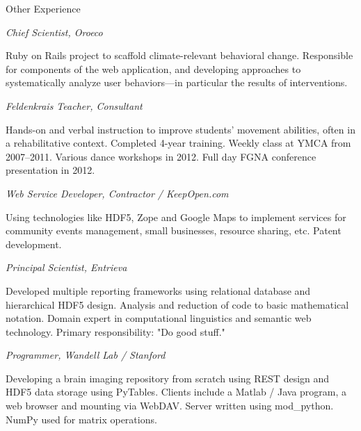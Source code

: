 \begin{rubric}{Other Experience}


\entry*[2012--present] \emph{Chief Scientist, Oroeco}
    \par Ruby on Rails project to scaffold climate-relevant behavioral change.
    Responsible for components of the web application, and developing approaches
    to systematically analyze user behaviors---in particular the results of
    interventions.

\entry*[2007--present] \emph{Feldenkrais Teacher, Consultant}
    \par  Hands-on and verbal instruction to improve students' movement
    abilities, often in a rehabilitative context.
    Completed 4-year training. Weekly class at YMCA from 2007--2011. Various
    dance workshops in 2012. Full day FGNA conference presentation in 2012.


\entry*[2004--2013] \emph{Web Service Developer, Contractor / KeepOpen.com}
    \par Using technologies like HDF5, Zope and Google Maps to implement services
    for community events management, small businesses, resource sharing, etc.
    Patent development.

\entry*[2006--2007] \emph{Principal Scientist, Entrieva}
    \par Developed multiple reporting frameworks using relational database and
    hierarchical HDF5 design.  Analysis and reduction of code to basic
    mathematical notation.  Domain expert in computational linguistics and
    semantic web technology.  Primary responsibility: "Do good stuff."

\entry*[2006] \emph{Programmer, Wandell Lab / Stanford}
    \par Developing a brain imaging repository from scratch using REST design
    and HDF5 data storage using PyTables.  Clients include a Matlab /
    Java program, a web browser and mounting via WebDAV.  Server
    written using mod_python.  NumPy used for matrix operations.


\end{rubric}
